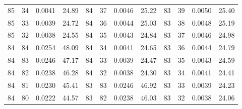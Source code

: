 \begin{tabular}{llll|llll|llll}
85 & 34 & 0.0041 & 24.89 & 84 & 37 & 0.0046 & 25.22 & 83 & 39 & 0.0050 & 25.40\\
85 & 33 & 0.0039 & 24.72 & 84 & 36 & 0.0044 & 25.03 & 83 & 38 & 0.0048 & 25.19\\
85 & 32 & 0.0038 & 24.55 & 84 & 35 & 0.0043 & 24.84 & 83 & 37 & 0.0046 & 24.98\\
84 & 84 & 0.0254 & 48.09 & 84 & 34 & 0.0041 & 24.65 & 83 & 36 & 0.0044 & 24.79\\
84 & 83 & 0.0246 & 47.17 & 84 & 33 & 0.0039 & 24.47 & 83 & 35 & 0.0043 & 24.59\\
84 & 82 & 0.0238 & 46.28 & 84 & 32 & 0.0038 & 24.30 & 83 & 34 & 0.0041 & 24.41\\
84 & 81 & 0.0230 & 45.41 & 83 & 83 & 0.0246 & 46.92 & 83 & 33 & 0.0039 & 24.23\\
84 & 80 & 0.0222 & 44.57 & 83 & 82 & 0.0238 & 46.03 & 83 & 32 & 0.0038 & 24.06\\
\bottomrule
\end{tabular}
\newpage
